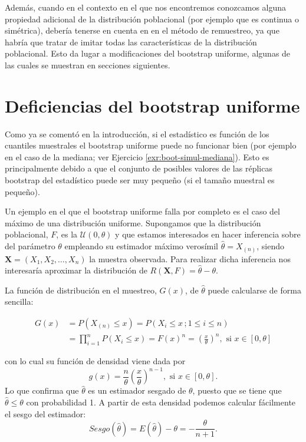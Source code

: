 \documentclass[
  spanish,
  10pt,
]{book}
\renewcommand{\mathbf}[1]{\symbf{#1}}
\theoremstyle{break}
\theoremstyle{nonumberplain}
\begin{document}
Además, cuando en el contexto en el que nos encontremos conozcamos alguna propiedad adicional de la distribución poblacional (por ejemplo que es continua o simétrica), debería tenerse en cuenta en en el método de remuestreo, ya que habría que tratar de imitar todas las características de la distribución poblacional.
Esto da lugar a modificaciones del bootstrap uniforme, algunas de las cuales se muestran en secciones siguientes.

\section{Deficiencias del bootstrap uniforme}\label{deficien-unif}

Como ya se comentó en la introducción, si el estadístico es función de los cuantiles muestrales el bootstrap uniforme puede no funcionar bien (por ejemplo en el caso de la mediana; ver Ejercicio \ref{exr:boot-simul-mediana}).
Esto es principalmente debido a que el conjunto de posibles valores de las réplicas bootstrap del estadístico puede ser muy pequeño (si el tamaño muestral es pequeño).

Un ejemplo en el que el bootstrap uniforme falla por completo es el caso del máximo de una distribución uniforme.
Supongamos que la distribución poblacional, \(F\), es la \(\mathcal{U}\left( 0,\theta \right)\) y que estamos interesados en hacer inferencia sobre del parámetro \(\theta\) empleando su estimador máximo verosímil \(\hat{\theta}=X_{(n)}\), siendo \(\mathbf{X}=\left( X_1,X_2,\ldots ,X_n \right)\) la muestra observada.
Para realizar dicha inferencia nos interesaría aproximar la distribución de
\(R\left( \mathbf{X},F \right) =\hat{\theta}-\theta\).

La función de distribución en el muestreo, \(G\left( x \right)\), de
\(\hat{\theta}\) puede calcularse de forma sencilla:

\[\begin{aligned}
G\left( x \right) &= P\left( X_{\left(
n \right)}\leq x \right) =P\left( X_i\leq x\,;
 1 \leq i \leq n \right) \\
&= \prod_{i=1}^{n}P\left( X_i\leq x \right) =F\left( x \right)^{n}=\left( 
\frac{x}{\theta } \right)^{n},\text{ si }x\in \left[ 0,\theta \right]\end{aligned}\]

con lo cual su función de densidad viene dada por
\[g\left( x \right) =\frac{n}{\theta }\left( \frac{x}{\theta } \right)^{n-1},
\text{ si }x\in \left[ 0,\theta \right] .\]
Lo que confirma que \(\hat{\theta}\) es un estimador sesgado de \(\theta\), puesto que se tiene que \(\hat{\theta}\leq \theta\) con probabilidad 1.
A partir de esta densidad podemos calcular fácilmente el sesgo del estimador:
\[Sesgo\left( \hat{\theta} \right) =E\left( \hat{\theta} \right) -\theta = -\frac{\theta }{n+1}.\]
\end{document}
